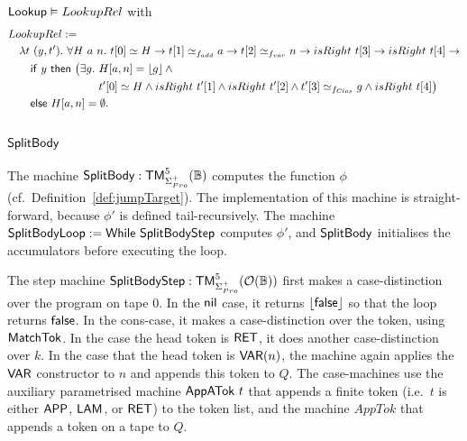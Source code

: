 \begin{lemma}
  \label{lem:Lookup_Realise}
  $\mathsf{Lookup} \mathrel{\vDash} LookupRel$
  with
  \small
  \begin{alignat*}{1}
    & LookupRel := \\
    &\quad \lambda t~(y, t').~\forall H~a~n.~ t[0] \simeq H \rightarrow t[1] \simeq_{f_{add}} a \rightarrow t[2] \simeq_{f_{var}} n \rightarrow isRight~t[3] \rightarrow isRight~t[4] \rightarrow \\
    &\quad\quad \MS{if}~y~\MS{then}~\bigl(\exists g.~H[a,n] = \Some{g} \land \\
    &\quad\quad \phantom{\MS{if}~y~\MS{then}~\bigl(\exists g.~} t'[0] \simeq H \land isRight~t'[1] \land isRight~t'[2] \land t'[3] \simeq_{f_{Clos}} g \land isRight~t[4]\bigr) \\
    &\quad\quad \MS{else}~ H[a,n] = \None.
\end{alignat*}
\end{lemma}


\subsection{$\mathsf{SplitBody}$}
\label{sec:SplitBody}

The machine $\mathsf{SplitBody} : \mathsf{TM}_{\Sigma^+_{Pro}}^5(\mathbb{B})$ computes the function $\phi$ (cf.\ Definition~\ref{def:jumpTarget}).  The
implementation of this machine is straight-forward, because $\phi'$ is defined tail-recursively.  The machine
$\mathsf{SplitBodyLoop} := \mathsf{While}~\mathsf{SplitBodyStep}$ computes $\phi'$, and $\mathsf{SplitBody}$ initialises the accumulators before executing the loop.

The step machine $\mathsf{SplitBodyStep} : \mathsf{TM}_{\Sigma^+_{Pro}}^5(\mathcal{O}(\mathbb{B}))$ first makes a case-distinction over the program on tape $0$.  In the
$\mathsf{nil}$ case, it returns $\left\lfloor {\ensuremath{\mathsf{false}}} \right\rfloor$ so that the loop returns $\mathsf{false}$.  In the cons-case, it makes a case-distinction over the token, using
$\mathsf{MatchTok}$.  In the case the head token is $\mathsf{RET}$, it does another case-distinction over $k$.  In the case that the head token is
$\mathsf{VAR}(n)$, the machine again applies the $\mathsf{VAR}$ constructor to $n$ and appends this token to $Q$.  The case-machines use the auxiliary
parametrised machine $\mathsf{AppATok}~t$ that appends a finite token (i.e.\ $t$ is either $\mathsf{APP}$, $\mathsf{LAM}$, or $\mathsf{RET}$) to the token list, and
the machine $AppTok$ that appends a token on a tape to $Q$.


